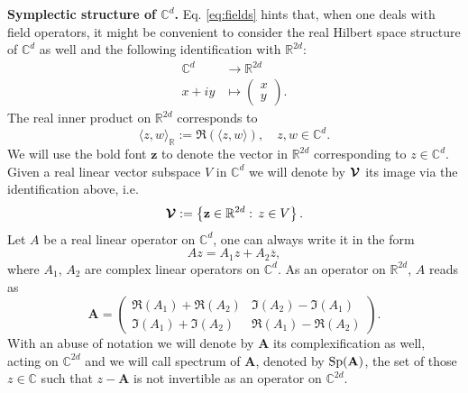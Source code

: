 \documentclass[preprint]{elsarticle}
\theoremstyle{definition}
\def\CC{\mathbb{C}}
\def\RR{\mathbb{R}}
\begin{document}
\bigskip \textbf{Symplectic structure of $\CC^d$.} Eq. \eqref{eq:fields} hints that, when one deals with field operators, it might be convenient to consider the real Hilbert space structure of $\CC^d$ as well and the following identification with $\RR^{2d}$:
\begin{align*}
\CC^d &\longrightarrow \RR^{2d}\\
x+iy &\longmapsto \begin{pmatrix} x \\ y\end{pmatrix}.
\end{align*}
The real inner product on $\RR^{2d}$ corresponds to
$$\langle z,w \rangle_\RR:=\Re(\langle z,w \rangle), \quad z,w \in \CC^d.$$
We will use the bold font $\mathbf{z}$ to denote the vector in $\RR^{2d}$ corresponding to $z \in \CC^d$. Given a real linear vector subspace $V$ in $\CC^{d}$ we will denote by $\boldsymbol{{\cal V}}$ its image via the identification above, i.e.
$$
\boldsymbol{{\cal V}}:=\left \{ \mathbf{z} \in \RR^{2d} : \, z \in V\right \}.
$$
Let $A$ be a real linear operator on $\CC^d$, one can always write it in the form
\begin{equation} \label{eq:A1A2}
Az=A_1z+A_2\overline{z},
\end{equation}
where $A_1$, $A_2$ are complex linear operators on $\CC^d$. As an operator on $\RR^{2d}$, $A$ reads as
\begin{equation} \label{eq:boldA}
\mathbf{A}=\begin{pmatrix} \Re(A_1)+\Re(A_2) & \Im(A_2)-\Im(A_1) \\
\Im(A_1)+\Im(A_2) & \Re(A_1)-\Re(A_2)
\end{pmatrix}.
\end{equation}
With an abuse of notation we will denote by $\mathbf{A}$ its complexification as well, acting on $\CC^{2d}$ and we will call spectrum of $\mathbf{A}$, denoted by ${\rm Sp}(\mathbf{A})$, the set of those $z \in \CC$ such that $z-\mathbf{A}$ is not invertible as an operator on $\CC^{2d}$.
\end{document}
